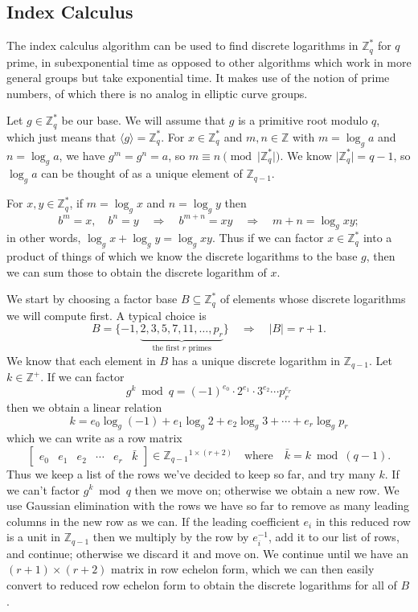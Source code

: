 \documentclass[12pt]{article}
\newcommand*\Z{\mathbb{Z}}
\newcommand*\by{\times}
\newcommand*\card[2][]{#1\lvert #2 #1\rvert}
\newcommand*\cyc[2][]{#1\langle #2 #1\rangle}
\renewcommand*\implies{\Rightarrow}
\begin{document}
\subsection{Index Calculus}

The index calculus algorithm can be used to find discrete logarithms in $\Z_q^*$
for $q$ prime, in subexponential time as opposed to other algorithms which work
in more general groups but take exponential time.\cite{index} It makes use of the
notion of prime numbers, of which there is no analog in elliptic curve groups.

Let $g \in \Z_q^*$ be our base. We will assume that $g$ is a primitive root
modulo $q$, which just means that $\cyc{g} = \Z_q^*$. For $x \in \Z_q^*$ and $m,
n \in \Z$ with $m = \log_g a$ and $n = \log_g a$, we have $g^m = g^n = a$, so $m
\equiv n \pmod{\card{\Z_q^*}}$. We know $\card{\Z_q^*} = q - 1$, so $\log_g a$
can be thought of as a unique element of $\Z_{q - 1}$.

For $x, y \in \Z_q^*$, if $m = \log_g x$ and $n = \log_g y$ then
\[
  b^m = x, \quad b^n = y
  \quad\implies\quad b^{m + n} = xy
  \quad\implies\quad m + n = \log_g xy;
\]
in other words, $\log_g x + \log_g y = \log_g xy$. Thus if we can factor $x \in
\Z_q^*$ into a product of things of which we know the discrete logarithms to the
base $g$, then we can sum those to obtain the discrete logarithm of $x$.

We start by choosing a factor base $B \subseteq \Z_q^*$ of elements whose
discrete logarithms we will compute first. A typical choice is
\[
  B = \{
      -1, \underbrace{2, 3, 5, 7, 11, \dots, p_r}_{\text{the first $r$ primes}}
    \}
  \quad\implies\quad \card{B} = r + 1.
\]
We know that each element in $B$ has a unique discrete logarithm in $\Z_{q -
1}$. Let $k \in \Z^+$. If we can factor
\[ g^k \bmod q = (-1)^{e_0} \cdot 2^{e_1} \cdot 3^{e_2} \cdots p_r^{e_r} \]
then we obtain a linear relation
\[ k = e_0 \log_g(-1) + e_1 \log_g 2 + e_2 \log_g 3 + \cdots + e_r \log_g p_r \]
which we can write as a row matrix
\[
  \begin{bmatrix} e_0 & e_1 & e_2 & \cdots & e_r & \bar{k} \end{bmatrix}
    \in \Z_{q - 1}{}^{1 \by (r + 2)}
  \quad\text{where}\quad \bar{k} = k \bmod (q - 1).
\]
Thus we keep a list of the rows we've decided to keep so far, and try many $k$.
If we can't factor $g^k \bmod q$ then we move on; otherwise we obtain a new row.
We use Gaussian elimination with the rows we have so far to remove as many
leading columns in the new row as we can. If the leading coefficient $e_i$ in
this reduced row is a unit in $\Z_{q - 1}$ then we multiply by the row by
$e_i^{-1}$, add it to our list of rows, and continue; otherwise we discard it
and move on. We continue until we have an $(r + 1) \by (r + 2)$ matrix in row
echelon form, which we can then easily convert to reduced row echelon form to
obtain the discrete logarithms for all of $B$.
\end{document}
